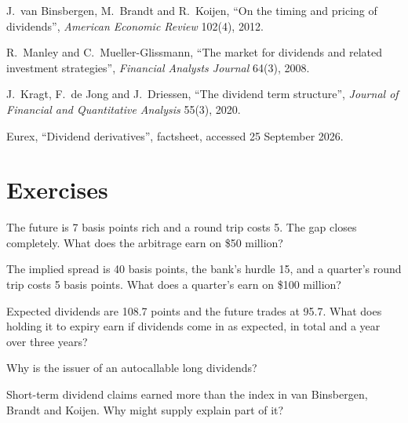 \begin{omsources}
\item J.~van Binsbergen, M.~Brandt and R.~Koijen, ``On the timing and pricing of dividends'', \emph{American Economic Review} 102(4), 2012.
\item R.~Manley and C.~Mueller-Glissmann, ``The market for dividends and related investment strategies'', \emph{Financial Analysts Journal} 64(3),
2008.
\item J.~Kragt, F.~de Jong and J.~Driessen, ``The dividend term structure'', \emph{Journal of Financial and Quantitative Analysis} 55(3), 2020.
\item Eurex, ``Dividend derivatives'', factsheet, accessed 25 September 2026.
\end{omsources}

\section{Exercises}

\begin{exercise}[$\star$]\label{exo:s2:delta-one-and-dividends:1}
The future is 7 basis points rich and a round trip costs 5. The gap closes completely. What does the arbitrage earn on \$50 million?
\end{exercise}

\begin{exercise}[$\star$]\label{exo:s2:delta-one-and-dividends:2}
The implied spread is 40 basis points, the bank's hurdle 15, and a quarter's round trip costs 5 basis points. What does a quarter's 
earn on \$100 million?
\end{exercise}

\begin{exercise}[$\star$]\label{exo:s2:delta-one-and-dividends:3}
Expected dividends are 108.7 points and the future trades at 95.7. What does holding it to expiry earn if dividends come in as expected, in total and a
year over three years?
\end{exercise}

\begin{exercise}[$\star\star$]\label{exo:s2:delta-one-and-dividends:4}
Why is the issuer of an autocallable long dividends?
\end{exercise}

\begin{exercise}[$\star\star$]\label{exo:s2:delta-one-and-dividends:5}
Short-term dividend claims earned more than the index in van Binsbergen, Brandt and Koijen. Why might supply explain part of it?
\end{exercise}

